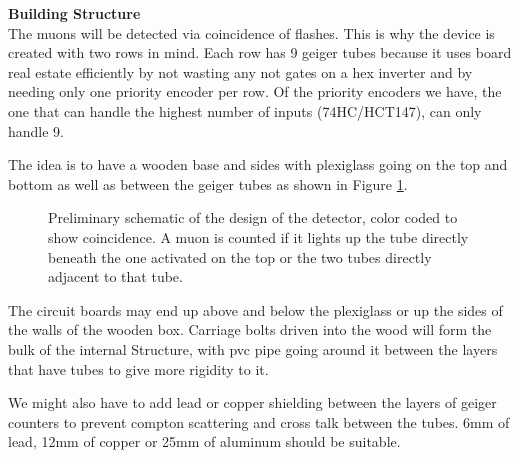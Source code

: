 \documentclass[oneside]{tufte-book}
\newenvironment{loggentry}[2]%
{\noindent\huge{\textbf{#2}}\normalsize\vspace{0.5cm}\marginnote{#1}\\}{\vspace{0.5cm}}
\begin{document}
  \begin{loggentry}{2018-Sep-4}{Building Structure}
    The muons will be detected via coincidence of flashes. This is why the device is created with two rows in mind. Each row has 9 geiger tubes because it uses board real estate efficiently by not wasting any not gates on a hex inverter and by needing only one priority encoder per row. Of the priority encoders we have, the one that can handle the highest number of inputs (74HC/HCT147), can only handle 9.

    The idea is to have a wooden base and sides with plexiglass going on the top and bottom as well as between the geiger tubes as shown in Figure \ref{coincidenceDetection}.

    \begin{figure}
        \centering
        \def\svgscale{0.36}
        
        \caption{Preliminary schematic of the design of the detector, color coded to show coincidence. A muon is counted if it lights up the tube directly beneath the one activated on the top or the two tubes directly adjacent to that tube.}
        \label{coincidenceDetection}
    \end{figure}

    The circuit boards may end up above and below the plexiglass or up the sides of the walls of the wooden box. Carriage bolts driven into the wood will form the bulk of the internal Structure, with pvc pipe going around it between the layers that have tubes to give more rigidity to it.

    We might also have to add lead or copper shielding between the layers of geiger counters to prevent compton scattering and cross talk between the tubes. 6mm of lead, 12mm of copper or 25mm of aluminum should be suitable.

  \end{loggentry}
\end{document}
